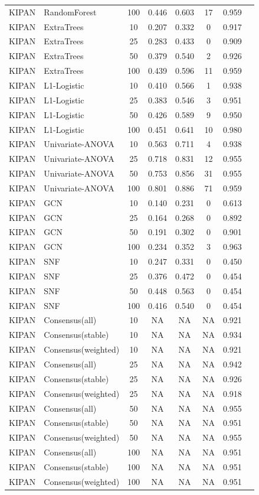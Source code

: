 \documentclass[utf8]{frontiers_suppmat}
\begin{document}
\begin{longtable}{llcccccc}
KIPAN & RandomForest & 100 & 0.446 & 0.603 & 17 & 0.959 \\
KIPAN & ExtraTrees & 10 & 0.207 & 0.332 & 0 & 0.917 \\
KIPAN & ExtraTrees & 25 & 0.283 & 0.433 & 0 & 0.909 \\
KIPAN & ExtraTrees & 50 & 0.379 & 0.540 & 2 & 0.926 \\
KIPAN & ExtraTrees & 100 & 0.439 & 0.596 & 11 & 0.959 \\
KIPAN & L1-Logistic & 10 & 0.410 & 0.566 & 1 & 0.938 \\
KIPAN & L1-Logistic & 25 & 0.383 & 0.546 & 3 & 0.951 \\
KIPAN & L1-Logistic & 50 & 0.426 & 0.589 & 9 & 0.950 \\
KIPAN & L1-Logistic & 100 & 0.451 & 0.641 & 10 & 0.980 \\
KIPAN & Univariate-ANOVA & 10 & 0.563 & 0.711 & 4 & 0.938 \\
KIPAN & Univariate-ANOVA & 25 & 0.718 & 0.831 & 12 & 0.955 \\
KIPAN & Univariate-ANOVA & 50 & 0.753 & 0.856 & 31 & 0.955 \\
KIPAN & Univariate-ANOVA & 100 & 0.801 & 0.886 & 71 & 0.959 \\
KIPAN & GCN & 10 & 0.140 & 0.231 & 0 & 0.613 \\
KIPAN & GCN & 25 & 0.164 & 0.268 & 0 & 0.892 \\
KIPAN & GCN & 50 & 0.191 & 0.302 & 0 & 0.901 \\
KIPAN & GCN & 100 & 0.234 & 0.352 & 3 & 0.963 \\
KIPAN & SNF & 10 & 0.247 & 0.331 & 0 & 0.450 \\
KIPAN & SNF & 25 & 0.376 & 0.472 & 0 & 0.454 \\
KIPAN & SNF & 50 & 0.448 & 0.563 & 0 & 0.454 \\
KIPAN & SNF & 100 & 0.416 & 0.540 & 0 & 0.454 \\
KIPAN & Consensus(all) & 10 & NA & NA & NA & 0.921 \\
KIPAN & Consensus(stable) & 10 & NA & NA & NA & 0.934 \\
KIPAN & Consensus(weighted) & 10 & NA & NA & NA & 0.921 \\
KIPAN & Consensus(all) & 25 & NA & NA & NA & 0.942 \\
KIPAN & Consensus(stable) & 25 & NA & NA & NA & 0.926 \\
KIPAN & Consensus(weighted) & 25 & NA & NA & NA & 0.918 \\
KIPAN & Consensus(all) & 50 & NA & NA & NA & 0.955 \\
KIPAN & Consensus(stable) & 50 & NA & NA & NA & 0.951 \\
KIPAN & Consensus(weighted) & 50 & NA & NA & NA & 0.955 \\
KIPAN & Consensus(all) & 100 & NA & NA & NA & 0.951 \\
KIPAN & Consensus(stable) & 100 & NA & NA & NA & 0.951 \\
KIPAN & Consensus(weighted) & 100 & NA & NA & NA & 0.951 \\
\end{longtable}
\end{document}
